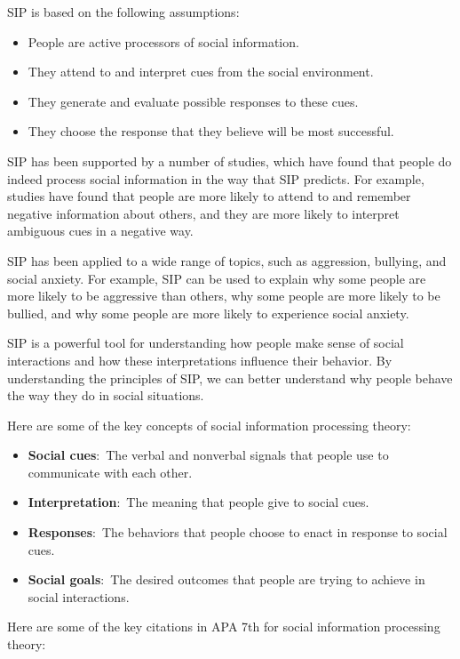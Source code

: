 \documentclass[
]{book}
\begin{document}
SIP is based on the following assumptions:

\begin{itemize}
\item
  People are active processors of social information.
\item
  They attend to and interpret cues from the social environment.
\item
  They generate and evaluate possible responses to these cues.
\item
  They choose the response that they believe will be most successful.
\end{itemize}

SIP has been supported by a number of studies, which have found that people do indeed process social information in the way that SIP predicts. For example, studies have found that people are more likely to attend to and remember negative information about others, and they are more likely to interpret ambiguous cues in a negative way.

SIP has been applied to a wide range of topics, such as aggression, bullying, and social anxiety. For example, SIP can be used to explain why some people are more likely to be aggressive than others, why some people are more likely to be bullied, and why some people are more likely to experience social anxiety.

SIP is a powerful tool for understanding how people make sense of social interactions and how these interpretations influence their behavior. By understanding the principles of SIP, we can better understand why people behave the way they do in social situations.

Here are some of the key concepts of social information processing theory:

\begin{itemize}
\item
  \textbf{Social cues}:~The verbal and nonverbal signals that people use to communicate with each other.
\item
  \textbf{Interpretation}:~The meaning that people give to social cues.
\item
  \textbf{Responses}:~The behaviors that people choose to enact in response to social cues.
\item
  \textbf{Social goals}:~The desired outcomes that people are trying to achieve in social interactions.
\end{itemize}

Here are some of the key citations in APA 7th for social information processing theory:
\end{document}
